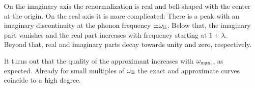 On the imaginary axis the renormalization is real and bell-shaped with the
center at the origin. On the real axis it is more complicated: There is a peak
with an imaginary discontinuity at the phonon frequency $\pm \omega \sb{\text{E}}$.
Below that, the imaginary part vanishes and the real part increases with
frequency starting at $1 + \lambda$. Beyond that, real and imaginary parts decay
towards unity and zero, respectively.

It turns out that the quality of the  approximant increases with
$\omega \sb{\text{max.}}$, as expected. Already for small multiples of $\omega \sb{\text{E}}$
the exact and approximate curves coincide to a high degree.
